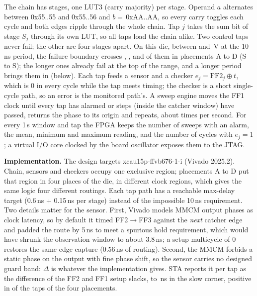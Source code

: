 \documentclass[conference]{IEEEtran}
\begin{document}
The chain has \vChainStages{} stages, one LUT3 (carry majority) per stage. Operand $a$ alternates
between 0x55..55 and 0x55..56 and $b=$\,0xAA..AA, so every carry toggles each cycle and both edges
ripple through the whole chain.
Tap $j$ takes the sum bit of stage $S_j$ through its own LUT, so all taps load the chain alike. Two
control taps never fail; the other \vTapNlong{} are four stages apart. On this die, between
\vTapVhi{} and \vTapVlo\,V at the 10\,ns period, the failure boundary crosses \vTapAN, \vTapBN,
\vTapCN{} and \vTapDN{} of them in placements A to D (S\vTenStageLo{} to S\vTenStageHi); the longer ones already fail at
the top of the range, and a longer period brings them in (below). Each tap feeds a sensor and a
checker $e_j=\mathrm{FF2}_j\oplus t$, which is 0 in every
cycle while the tap meets timing; the checker is a short single-cycle path, so an error is the
monitored path's. A sweep engine moves the FF1 clock until every tap has alarmed or \vMaxSteps{}
steps (inside the catcher window) have passed, returns the phase to its origin and repeats, about
\vTapSweepsPerS{} times per second. For every 1\,s window and tap the FPGA keeps the number of sweeps
with an alarm, the mean, minimum and maximum reading, and the number of cycles with $e_j=1$; a
virtual I/O core clocked by the board oscillator exposes them to the JTAG.

\textbf{Implementation.} The design targets xcau15p-ffvb676-1-i (Vivado 2025.2). Chain, sensors and
checkers occupy one exclusive region; placements A to D put that region in four places of the die,
in different clock regions, which gives the same logic four different routings. Each tap path has a
reachable max-delay target (0.6\,ns + 0.15\,ns per stage) instead of the impossible 10\,ns
requirement. Two details matter for the sensor. First, Vivado models MMCM output phases as clock
latency, so by default it timed FF2$\rightarrow$FF3 against the \emph{next} catcher edge and padded
the route by 5\,ns to meet a spurious hold requirement, which would have shrunk the observation
window to about 3.8\,ns; a setup multicycle of 0 restores the same-edge capture (0.56\,ns of
routing). Second, the MMCM forbids a static phase on the output with fine phase shift, so the
sensor carries no designed guard band: $\Delta$ is whatever the implementation gives. STA reports
it per tap as the difference of the FF2 and FF1 setup slacks, \vStaDeltaLo{} to \vStaDeltaHi\,ns in
the slow corner, positive in \vStaDeltaPosN{} of the \vStaDeltaTaps{} taps of the four placements.
\end{document}
